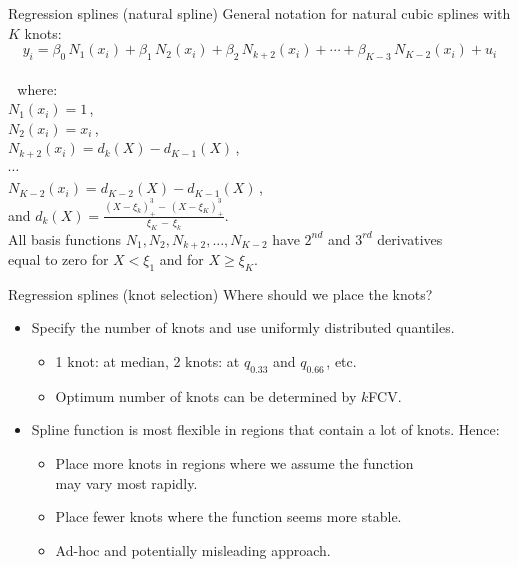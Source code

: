 \documentclass{beamer}
\begin{document}
\begin{frame}{Regression splines (natural spline)}
General notation for natural cubic splines with $K$ knots:
$$y_i = \beta_0 \, N_1 (x_i)  + \beta_1 \, N_2 (x_i) + \beta_2 \, N_{k+2} (x_i) + \cdots + \beta_{K-3} \, N_{K-2} (x_i) + u_i  $$\\
\vspace{-0.2cm}
~\,where:\\
\smallskip
\qquad $N_1 (x_i) = 1$\,,\\
\smallskip
\qquad $N_2 (x_i) = x_i$\,,\\
\smallskip
\qquad $N_{k+2} (x_i) = d_k(X)-d_{K-1}(X)\,$,\\
\qquad $\cdots$\\
\qquad $N_{K-2} (x_i) = d_{K-2}(X)-d_{K-1}(X)\,$,\\
\bigskip
\qquad and $d_k(X)=\frac{(X-\xi_k)_{+}^3 - \, (X-\xi_K)_{+}^3}{\xi_K \,-\, \xi_k}$.\\
\bigskip
All basis functions $N_1,N_2,N_{k+2},\dots,N_{K-2}$ have $2^{nd}$ and $3^{rd}$ derivatives \\equal to zero for $X < \xi_1$ and for $X \geq \xi_K$.
\end{frame}
\begin{frame}{Regression splines (knot selection)}
Where should we place the knots?\\
\bigskip
\begin{itemize}
    \item Specify the number of knots and use uniformly distributed quantiles.\\
    \medskip    
    \begin{itemize}
        \item 1 knot: at median, 2 knots: at $q_{0.33}$ and $q_{0.66\,}$, etc.
        \smallskip
        \item Optimum number of knots can be determined by $k$FCV.
    \end{itemize}
    \bigskip
    \item Spline function is most flexible in regions that contain a lot of knots. Hence:\\
    \medskip    
    \begin{itemize}
        \item Place more knots in regions where we assume the function \\may vary most rapidly.
        \smallskip
        \item Place fewer knots where the function seems more stable.
        \smallskip
        \item Ad-hoc and potentially misleading approach.
    \end{itemize}
\end{itemize}
\end{frame}
\end{document}

